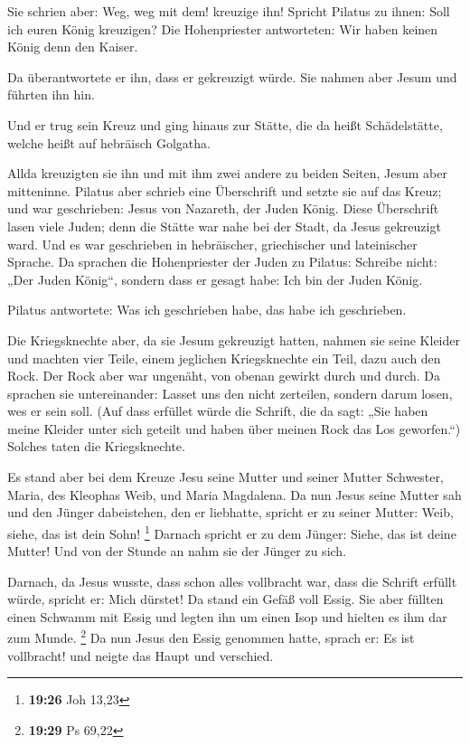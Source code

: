  Sie schrien aber: Weg, weg mit dem! kreuzige ihn!
Spricht Pilatus zu ihnen: Soll ich euren König kreuzigen? Die
Hohenpriester antworteten: Wir haben keinen König denn den Kaiser.

 Da überantwortete er ihn, dass er gekreuzigt würde. Sie
nahmen aber Jesum und führten ihn hin.

 Und er trug sein Kreuz und ging hinaus zur Stätte, die
da heißt Schädelstätte, welche heißt auf hebräisch Golgatha.

 Allda kreuzigten sie ihn und mit ihm zwei andere zu
beiden Seiten, Jesum aber mitteninne.  Pilatus aber
schrieb eine Überschrift und setzte sie auf das Kreuz; und war
geschrieben: Jesus von Nazareth, der Juden König.  Diese
Überschrift lasen viele Juden; denn die Stätte war nahe bei der Stadt,
da Jesus gekreuzigt ward. Und es war geschrieben in hebräischer,
griechischer und lateinischer Sprache.  Da sprachen die
Hohenpriester der Juden zu Pilatus: Schreibe nicht: „Der Juden König``,
sondern dass er gesagt habe: Ich bin der Juden König.

 Pilatus antwortete: Was ich geschrieben habe, das habe
ich geschrieben.

 Die Kriegsknechte aber, da sie Jesum gekreuzigt hatten,
nahmen sie seine Kleider und machten vier Teile, einem jeglichen
Kriegsknechte ein Teil, dazu auch den Rock. Der Rock aber war ungenäht,
von obenan gewirkt durch und durch.  Da sprachen sie
untereinander: Lasset uns den nicht zerteilen, sondern darum losen, wes
er sein soll. (Auf dass erfüllet würde die Schrift, die da sagt: „Sie
haben meine Kleider unter sich geteilt und haben über meinen Rock das
Los geworfen.``) Solches taten die Kriegsknechte.

 Es stand aber bei dem Kreuze Jesu seine Mutter und
seiner Mutter Schwester, Maria, des Kleophas Weib, und Maria Magdalena.
 Da nun Jesus seine Mutter sah und den Jünger
dabeistehen, den er liebhatte, spricht er zu seiner Mutter: Weib, siehe,
das ist dein Sohn! \footnote{\textbf{19:26} Joh 13,23} 
Darnach spricht er zu dem Jünger: Siehe, das ist deine Mutter! Und von
der Stunde an nahm sie der Jünger zu sich.

 Darnach, da Jesus wusste, dass schon alles vollbracht
war, dass die Schrift erfüllt würde, spricht er: Mich dürstet!
 Da stand ein Gefäß voll Essig. Sie aber füllten einen
Schwamm mit Essig und legten ihn um einen Isop und hielten es ihm dar
zum Munde. \footnote{\textbf{19:29} Ps 69,22}  Da nun
Jesus den Essig genommen hatte, sprach er: Es ist vollbracht! und neigte
das Haupt und verschied.

